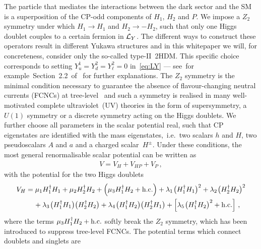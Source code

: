 \documentclass[a4paper, 11pt,notoc]{article}
\begin{document}
The particle that mediates the interactions between the dark sector and the SM is a superposition of the CP-odd components of $H_1$, $H_2$ and $P$. We impose a $Z_2$ symmetry under which $H_1\to H_1$ and $H_2\to -H_2$, such that only one Higgs doublet couples to a certain fermion in ${\cal L}_{Y}$. The different ways to construct these operators result in different Yukawa structures and in this whitepaper we will, for concreteness, consider only the so-called type-II~2HDM. This specific choice corresponds to setting $Y_u^1  = Y_d^2 = Y_\ell^2 =0$ in~\eqref{eq:LY} --- see~for example~Section~2.2~of~\cite{Bauer:2017ota} for further explanations.  The $Z_2$ symmetry is the minimal condition necessary to guarantee the absence of flavour-changing neutral currents (FCNCs) at tree-level~\cite{Glashow:1976nt,Paschos:1976ay} and such a symmetry is realised in many well-motivated complete ultraviolet~(UV) theories in the form of supersymmetry, a $U(1)$ symmetry or  a discrete symmetry acting on the Higgs doublets. We further choose all parameters in the scalar potential real, such that CP eigenstates are identified with the mass eigenstates,~i.e.~two scalars $h$ and $H$, two pseudoscalars $A$ and $a$ and a charged scalar~$H^\pm$. Under these conditions, the most general renormalisable scalar potential can be written as 
\begin{align} \label{eq:V2HDMa}
V=V_H+V_{HP}+V_P\,,
\end{align}
with the potential for the two Higgs doublets
\begin{equation}\label{eq:VH}
\begin{split}
V_{H} & = \mu_1 H_1^\dagger H_1 + \mu_2 H_2^\dagger H_2 + \left ( \mu_3  H_1^\dagger H_2 + {\rm h.c.} \right ) + \lambda_1  \hspace{0.25mm} \big ( H_1^\dagger H_1  \big )^2  + \lambda_2  \hspace{0.25mm} \big ( H_2^\dagger H_2 \big  )^2  \\
& \phantom{xx} +  \lambda_3 \hspace{0.25mm} \big ( H_1^\dagger H_1  \big ) \big ( H_2^\dagger H_2  \big ) + \lambda_4  \hspace{0.25mm} \big ( H_1^\dagger H_2  \big ) \big ( H_2^\dagger H_1  \big ) + \left [ \lambda_5   \hspace{0.25mm} \big ( H_1^\dagger H_2 \big )^2 + {\rm h.c.} \right ]  \,,
\end{split}
\end{equation}
where the terms $\mu_3  H_1^\dagger H_2 + {\rm h.c.}$  softly break the  $Z_2$ symmetry, which has been introduced to suppress tree-level FCNCs. The potential terms which connect doublets and singlets are 
\end{document}
